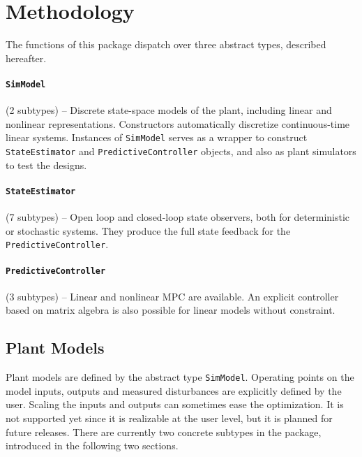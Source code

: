 
\section{Methodology}

The functions of this package dispatch over three abstract types, described hereafter.

\paragraph{\texttt{SimModel}} (2 subtypes) -- Discrete state-space models of the plant, including linear and nonlinear representations. Constructors automatically discretize continuous-time linear systems. Instances of \texttt{SimModel} serves as a wrapper to construct \texttt{StateEstimator} and \texttt{PredictiveController} objects, and also as plant simulators to test the designs.

\paragraph{\texttt{StateEstimator}} (7 subtypes) -- Open loop and closed-loop state observers, both for deterministic or stochastic systems. They produce the full state feedback for the \texttt{PredictiveController}.

\paragraph{\texttt{PredictiveController}} (3 subtypes)  -- Linear and nonlinear MPC are available. An explicit controller based on matrix algebra is also possible for linear models without constraint.

\subsection{Plant Models}

Plant models are defined by the abstract type \texttt{SimModel}. Operating points on the model inputs, outputs and measured disturbances are explicitly defined by the user. Scaling the inputs and outputs can sometimes ease the optimization. It is not supported yet since it is realizable at the user level, but it is planned for future releases. There are currently two concrete subtypes in the package, introduced in the following two sections. 

